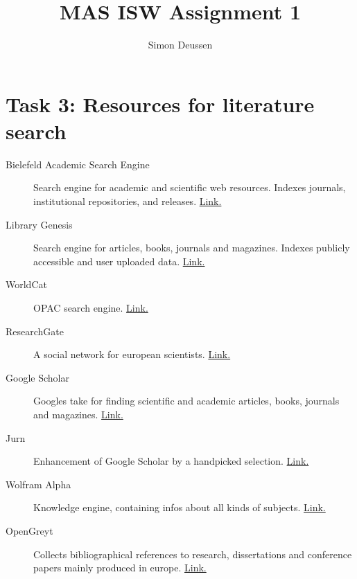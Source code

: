 \documentclass{article}
\title{MAS ISW Assignment 1}
\date{}
\author{Simon Deussen}
\begin{document}
  \maketitle

\section*{Task 3: Resources for literature search}
\begin{description}
    \item[Bielefeld Academic Search Engine] 
    Search engine for academic and scientific web resources. Indexes journals, institutional repositories, and releases.
    \href{https://www.base-search.net/}{Link.}
    
    \item[Library Genesis] 
    Search engine for articles, books, journals and magazines. Indexes publicly accessible and 
    user uploaded data. \href{http://libgen.rs/}{Link.}

    \item[WorldCat] OPAC search engine. \href{www.worldcat.org}{Link.}

    \item[ResearchGate] A social network for european scientists. \href{https://www.researchgate.net/}{Link.}
    
    \item[Google Scholar] Googles take for finding scientific and 
    academic articles, books, journals and magazines. 
    \href{https://scholar.google.com/}{Link.}

    \item[Jurn] 
    Enhancement of Google Scholar by a handpicked selection. \href{http://www.jurn.org/#gsc.tab=0}{Link.}
  
    \item[Wolfram Alpha] 
    Knowledge engine, containing infos about all kinds of subjects. \href{https://www.wolframalpha.com/}{Link.}
     
    \item[OpenGreyt]
    Collects bibliographical references to research, dissertations and conference papers mainly produced in europe. \href{http://www.opengrey.eu/}{Link.}
  \end{description}
\end{document}
